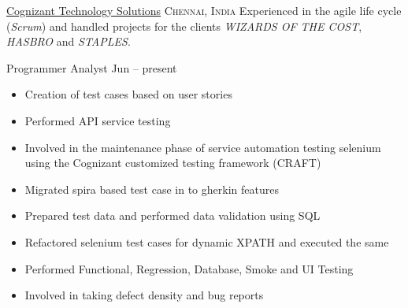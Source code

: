 
\headedsection  %
  {\href{https://www.cognizant.com}{Cognizant Technology Solutions}}
  {\textsc{Chennai, India}} 
  {\newline{}Experienced in the agile life cycle (\emph{Scrum}) and handled projects for the clients  \emph{WIZARDS OF THE COST}, \emph{HASBRO} and \emph{STAPLES}.
} 
  {%
  \headedsubsection
    {Programmer Analyst}
    {Jun  -- present}
    {\begin{itemize}
        \item Creation of test cases based on user stories 
        \item Performed API service testing
        \item Involved in the maintenance phase of service automation testing selenium using  the Cognizant customized testing framework (CRAFT)
        \item Migrated spira based test case in to gherkin features
        \item Prepared test data and performed data validation using SQL
        \item Refactored selenium test cases for dynamic XPATH and executed the same
        \item Performed Functional, Regression, Database, Smoke and UI Testing
        \item Involved in taking defect density and bug reports
    \end{itemize}
    }
}
